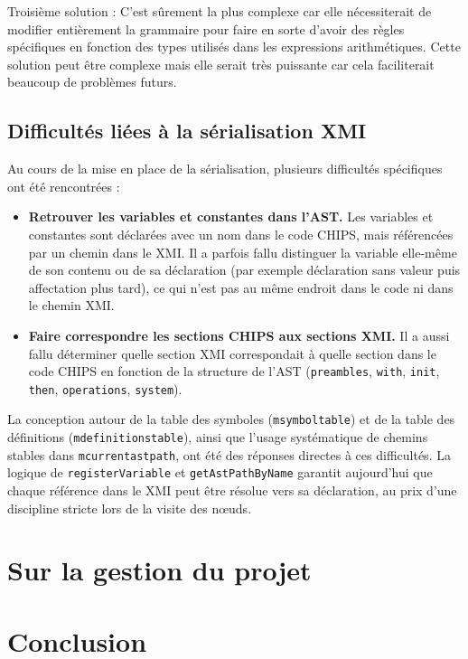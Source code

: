 \documentclass[a4paper, 11pt]{article}
\newcommand{\prog}[1]{\texttt{#1}}
\begin{document}
Troisième solution : C'est sûrement la plus complexe car elle nécessiterait de modifier entièrement la grammaire pour faire en sorte d'avoir des règles spécifiques en fonction des types utilisés dans les expressions arithmétiques. Cette solution peut être complexe mais elle serait très puissante car cela faciliterait beaucoup de problèmes futurs.

\subsection{Difficultés liées à la sérialisation XMI}

Au cours de la mise en place de la sérialisation, plusieurs difficultés spécifiques ont été rencontrées :

\begin{itemize}
  \item \textbf{Retrouver les variables et constantes dans l’AST.}  
  Les variables et constantes sont déclarées avec un nom dans le code CHIPS, mais référencées par un chemin dans le XMI. Il a parfois fallu distinguer la variable elle-même de son contenu ou de sa déclaration (par exemple déclaration sans valeur puis affectation plus tard), ce qui n’est pas au même endroit dans le code ni dans le chemin XMI.
  \item \textbf{Faire correspondre les sections CHIPS aux sections XMI.}  
  Il a aussi fallu déterminer quelle section XMI correspondait à quelle section dans le code CHIPS en fonction de la structure de l’AST (\prog{preambles}, \prog{with}, \prog{init}, \prog{then}, \prog{operations}, \prog{system}).
\end{itemize}

La conception autour de la table des symboles (\prog{msymboltable}) et de la table des définitions (\prog{mdefinitionstable}), ainsi que l’usage systématique de chemins stables dans \prog{mcurrentastpath}, ont été des réponses directes à ces difficultés. La logique de \prog{registerVariable} et \prog{getAstPathByName} garantit aujourd’hui que chaque référence dans le XMI peut être résolue vers sa déclaration, au prix d’une discipline stricte lors de la visite des nœuds.

\section{Sur la gestion du projet}

\section{Conclusion}
\end{document}
